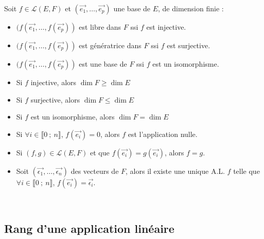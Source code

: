     Soit $f \in \mathcal{L}(E, F)$ et $(\vec{e_1}, \dots, \vec{e_p})$ une base de $E$, de dimension finie :
    \begin{itemize}
      \item $(f(\vec{e_1}, \dots, f(\vec{e_p}))$ est libre dans $F$ ssi $f$ est injective.
      \item $(f(\vec{e_1}, \dots, f(\vec{e_p}))$ est génératrice dans $F$ ssi $f$ est surjective.
      \item $(f(\vec{e_1}, \dots, f(\vec{e_p}))$ est une base de $F$ ssi $f$ est un isomorphisme.
      \item Si $f$ injective, alors $\dim{F} \ge \dim{E}$
      \item Si $f$ surjective, alors $\dim{F} \le \dim{E}$
      \item Si $f$ est un isomorphisme, alors $\dim{F} = \dim{E}$
      \item Si $\forall i \in \llbracket 0~;~n \rrbracket$, $f(\vec{e_i}) = 0$, alors $f$ est l'application nulle.
      \item Si $(f, g) \in \mathcal{L}(E, F)$ et que $f(\vec{e_i}) = g(\vec{e_i})$, alors $f = g$.
      \item Soit $(\vec{\epsilon_1}, \dots, \vec{\epsilon_n})$ des vecteurs de $F$, alors il existe une unique A.L. $f$ telle que $\forall i \in \llbracket 0~;~n \rrbracket$, $f(\vec{e_i}) = \vec{\epsilon_i}$.
    \end{itemize}
    \ \\
  
  \subsection{Rang d'une application linéaire}\label{subsec:rang-d'une-application-lineaire}

